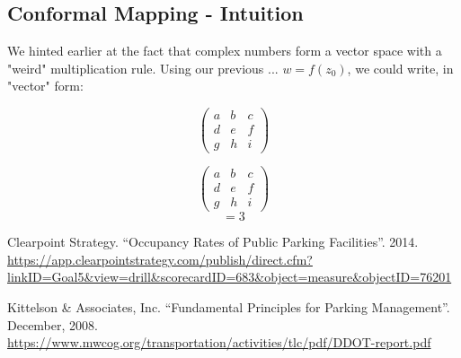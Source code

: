 \documentclass{article}
\begin{document}
\subsection{Conformal Mapping - Intuition}



We hinted earlier at the fact that complex numbers form a vector space with a "weird" multiplication rule. Using our previous ... $w = f(z_0)$, we could write, in "vector" form:

\[ \left( \begin{array}{ccc}
a & b & c \\
d & e & f \\
g & h & i \end{array} \right)\] 


\[ \left( \begin{array}{ccc}
a & b & c \\
d & e & f \\
g & h & i \end{array} \right)\] \begin{equation} = 3 \end{equation}



\newpage
\begin{thebibliography}{1}


 Clearpoint Strategy. ``Occupancy Rates of Public Parking Facilities''. 2014. \\ \url{https://app.clearpointstrategy.com/publish/direct.cfm?linkID=Goal5&view=drill&scorecardID=683&object=measure&objectID=76201}

 Kittelson \& Associates, Inc. ``Fundamental Principles for Parking Management''. December, 2008. \\ \url{https://www.mwcog.org/transportation/activities/tlc/pdf/DDOT-report.pdf}

\end{thebibliography}
\end{document}

